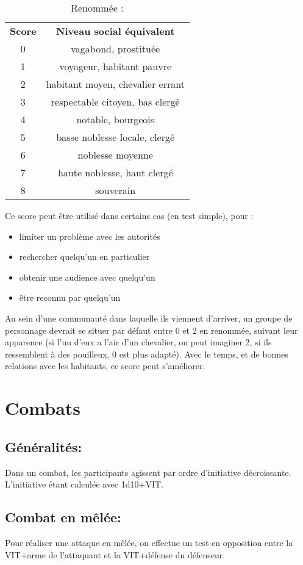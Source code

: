 \documentclass[10pt,a4paper,twocolumn]{book}
\begin{document}
\begin{table}
\caption{ Renommée :}
\label{tableRenommée}
\begin{center}
\begin{tabular}{cc}
\textbf{Score} & \textbf{Niveau social équivalent} \\
   0 & vagabond, prostituée  \\
   1 & voyageur, habitant pauvre  \\
   2 & habitant moyen, chevalier errant \\
   3 & respectable citoyen, bas clergé\\
   4 & notable, bourgeois \\
   5 & basse noblesse locale, clergé \\
   6 & noblesse moyenne \\
   7 & haute noblesse, haut clergé \\
   8 & souverain \\
\end{tabular}
\end{center}
\end{table}
Ce score peut être utilisé dans certains cas (en test simple), pour : 
\begin{itemize}
\item{}limiter un problème avec les autorités
\item{}rechercher quelqu’un en particulier
\item{}obtenir une audience avec quelqu’un
\item{}être reconnu par quelqu’un
\end{itemize}

Au sein d’une communauté dans laquelle ils viennent d’arriver, un groupe de personnage devrait se situer par défaut entre 0 et 2 en renommée, suivant leur apparence (si l’un d’eux a l’air d’un chevalier, on peut imaginer 2, si ils ressemblent à des pouilleux, 0 est plus adapté). Avec le temps, et de bonnes relations avec les habitants, ce score peut s’améliorer.

\section{Combats}
\subsection{Généralités:}
Dans un combat, les participants agissent par ordre d’initiative décroissante. L’initiative étant calculée avec 1d10+VIT.
\subsection{Combat en mêlée:}
Pour réaliser une attaque en mêlée, on effectue un test en opposition entre la VIT+arme de l’attaquant et la VIT+défense du défenseur.
\end{document}
